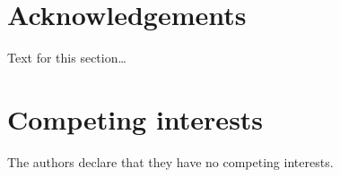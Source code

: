 \documentclass{bmcart}
\begin{document}

\begin{backmatter}

\section*{Acknowledgements}%
Text for this section\ldots

\section*{Competing interests}
The authors declare that they have no competing interests.



\end{backmatter}
\end{document}
